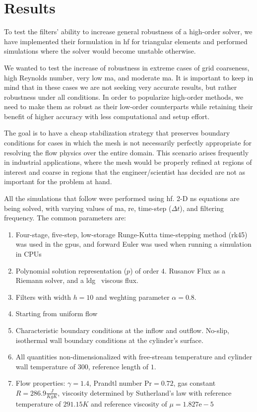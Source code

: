 \section{Results}
\label{sec:results}
To test the filters' ability to increase general robustness of a high-order solver, we have implemented their formulation in \gls{hf} for triangular elements and performed simulations where the solver would become unstable otherwise.

We wanted to test the increase of robustness in extreme cases of grid coarseness, high Reynolds number, very low \gls{ma}, and moderate \gls{ma}. It is important to keep in mind that in these cases we are not seeking very accurate results, but rather robustness under all conditions. In order to popularize high-order methods, we need to make them as robust as their low-order counterparts while retaining their benefit of higher accuracy with less computational and setup effort.

The goal is to have a cheap stabilization strategy that preserves boundary conditions for cases in which the mesh is not necessarily perfectly appropriate for resolving the flow physics over the entire domain. This scenario arises frequently in industrial applications, where the mesh would be properly refined at regions of interest and coarse in regions that the engineer/scientist has decided are not as important for the problem at hand.

All the simulations that follow were performed using \gls{hf}\cite{lopez2014verification}. 2-D \gls{ns} equations are being solved, with varying values of \gls{ma}, \gls{re}, time-step ($\Delta t$), and filtering frequency. The common parameters are:
\begin{enumerate}[1.]
\item Four-stage, five-step, low-storage Runge-Kutta time-stepping method (\gls{rk45}) \cite{carpenter1994fourth} was used in the \gls{gpu}s, and forward Euler was used when running a simulation in CPUs
\item Polynomial solution representation ($p$) of order $4$. Rusanov Flux as a Riemann solver, and a \gls{ldg}~\cite{cockburn1998local} viscous flux.
\item Filters with width $h = 10$ and weghting parameter $\alpha = 0.8$.
\item Starting from uniform flow
\item Characteristic boundary conditions at the inflow and outflow. No-slip, isothermal wall boundary conditions at the cylinder's surface.
\item All quantities non-dimensionalized with free-stream temperature and cylinder wall temperature of $300$, reference length of $1$.
\item Flow properties: $\gamma = 1.4$, Prandtl number $\mathrm{Pr} = 0.72$, gas constant $R = 286.9 \frac{J}{Kg K}$, viscosity determined by Sutherland's law with reference temperature of $291.15 K$ and reference viscosity of $\mu = 1.827\mathrm{e}-5$
\end{enumerate}

